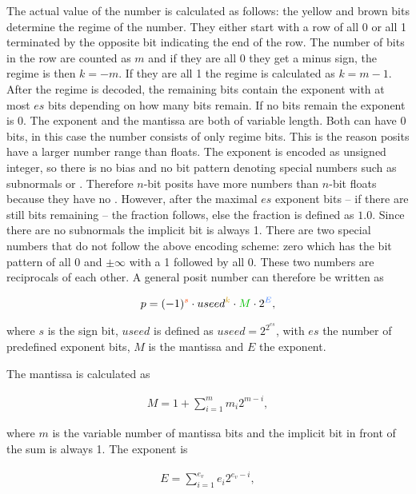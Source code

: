 \documentclass{article}
\theoremstyle{plain} %
\theoremstyle{convention} %
\theoremstyle{remark} %
\numberwithin{equation}{section}
\begin{document}
The actual value of the number is calculated as follows: the yellow and brown bits determine the regime of the number. They either start with a \textcolor{cyellow}{row of all \num{0} or all \num{1}} terminated by the \textcolor{cbrown}{opposite bit} indicating the end of the row. The number of bits in the row are counted as $m$ and if they are all \num{0} they get a minus sign, the regime is then $k=-m$. If they are all \num{1} the regime is calculated as $k=m-1$. After the regime is decoded, the remaining bits contain the exponent with at most $es$ bits depending on how many bits remain. If no bits remain the exponent is \num{0}. The exponent and the mantissa are both of variable length. Both can have \num{0} bits, in this case the number consists of only regime bits. This is the reason posits have a larger number range than floats. The exponent is encoded as unsigned integer, so there is no bias and no bit pattern denoting special numbers such as subnormals or . Therefore $n$-bit posits have more numbers than $n$-bit floats because they have no . However, after the maximal $es$ exponent bits -- if there are still bits remaining -- the fraction follows, else the fraction is defined as $1.0$. Since there are no subnormals the implicit bit is always \num{1}. There are two special numbers that do not follow the above encoding scheme: zero which has the bit pattern of all \num{0} and $\pm \infty$ with a \num{1} followed by all \num{0}. These two numbers are reciprocals of each other. A general posit number can therefore be written as

\begin{align*}
    p = (-1)^{\textcolor{corange}{s}} \cdot useed^{\textcolor{cyellow}{k}} \cdot \textcolor{cgreen}{M} \cdot 2^{\textcolor{cblue}{E}},
\end{align*}

where $s$ is the sign bit, $useed$ is defined as $useed = 2^{2^{es}}$, with $es$ the number of predefined exponent bits, $M$ is the mantissa and $E$ the exponent.

The mantissa is calculated as

\begin{align*}
    M = 1 + \sum_{i=1}^{m} m_{i} 2^{m-i},
\end{align*}

where $m$ is the variable number of mantissa bits and the implicit bit in front of the sum is always \num{1}. The exponent is

\begin{align*}
    E = \sum_{i=1}^{e_v} e_{i} 2^{e_v-i},
\end{align*}
\end{document}
